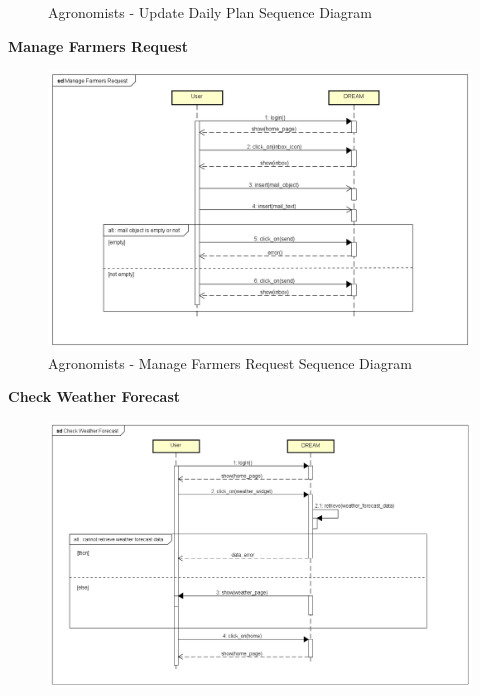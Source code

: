 \documentclass[table, 12pt]{article}
\begin{document}
\begin{itemize}
\begin{center}
\begin{figure}[H]
                    \caption{Agronomists - Update Daily Plan Sequence Diagram}
                    \label{fig: sdAgronomist_updateDailyPlan}
                \end{figure}
            \end{center}
            \textbf{Manage Farmers Request}\\
            \begin{center}
                \begin{figure}[H]
                    \includegraphics[scale=0.60, center]{assets/Sequence diagrams/Agronomist/Manage Farmers Request.png}
                    \caption{Agronomists - Manage Farmers Request Sequence Diagram}
                    \label{fig: sdAgronomist_manageFarmersRequest}
                \end{figure}
            \end{center}
            \newpage
            \textbf{Check Weather Forecast}\\
            \begin{center}
                \begin{figure}[H]
                    \includegraphics[scale=0.55, center]{assets/Sequence diagrams/Agronomist/Check Weather Forecast.png}

\end{figure}
\end{center}
\end{itemize}
\end{document}
